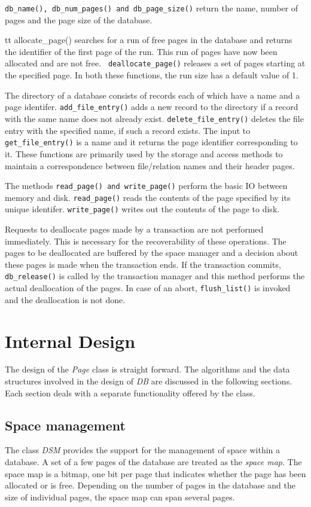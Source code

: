 {\tt  db\_name(), db\_num\_pages() and  db\_page\_size()} return  the name,
number of pages and the page size of the database.

{tt allocate\_page()} searches for a run  of free pages in the database
and returns the identifier of  the first page of the  run. This run of
pages  have     now   been  allocated   and    are     not  free. {\tt
deallocate\_page()} releases a set  of pages starting at the  specified
page. In both these functions, the run size has a default value of 1.

The directory  of a database consists of  records each of which have a
name and a page identifer. {\tt add\_file\_entry()} adds a new record to
the  directory if   a  record with  the   same name  does  not already
exist.   {\tt delete\_file\_entry()} deletes   the  file entry with  the
specified  name,  if  such   a  record  exists.   The input   to  {\tt
get\_file\_entry()}  is  a name  and  it   returns  the page  identifier
corresponding to it. These functions are primarily used by the storage
and access methods  to maintain a correspondence between file/relation
names and their header pages.

The methods  {\tt read\_page() and write\_page()}  perform the  basic IO
between memory  and disk. {\tt  read\_page()} reads the contents of the
page specified by its unique  identifer. {\tt write\_page()} writes out
the contents of the page to disk.

Requests to deallocate pages  made by a  transaction are not performed
immediately.  This  is necessary  for   the  recoverability of   these
operations.   The pages to be  deallocated   are buffered by the space
manager and a decision about these  pages is made when the transaction
ends. If the transaction commits, {\tt db\_release()}  is called by the
transaction manager and  this method performs  the actual deallocation
of the pages. In case of  an abort, {\tt  flush\_list()} is invoked and
the deallocation is not done.

\section{Internal Design}

The design of the {\em Page} class is straight forward. The algorithms
and the   data structures  involved in  the  design  of  {\em DB}  are
discussed in the  following  sections.   Each  section deals  with   a
separate functionality offered by the class.

\subsection{Space management}
The class {\em  DSM} provides the  support for the management of space
within a database. A set of a few pages of the database are treated as
the {\em space map}. The space map is a bitmap,  one bit per page that
indicates whether the page has been allocated or is free. Depending on
the number of pages in the database and the  size of individual pages,
the space map can span several pages.

